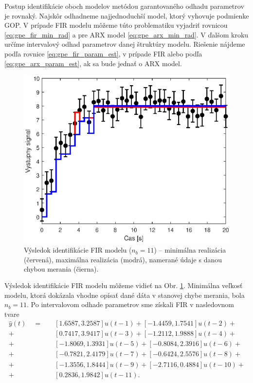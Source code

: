 Postup identifikácie oboch modelov metódou garantovaného odhadu parametrov je rovnaký. Najskôr odhadneme najjednoduchší model, ktorý vyhovuje podmienke GOP. V prípade FIR modelu môžeme túto problematiku vyjadriť rovnicou \ref{eq:gpe_fir_min_rad} a pre ARX model \ref{eq:gpe_arx_min_rad}. V ďalšom kroku určíme intervalový odhad parametrov danej štruktúry modelu. Riešenie nájdeme podľa rovnice \ref{eq:gpe_fir_param_est}, v prípade FIR alebo podľa \ref{eq:gpe_arx_param_est}, ak sa bude jednať o ARX model.

\begin{figure}
	\centering
	\includegraphics[width=0.7\linewidth]{images/gpe_tf_ex_FIRident}
	\caption{Výsledok identifikácie FIR modelu ($ n_b = 11 $) -- minimálna realizácia (červená), maximálna realizácia (modrá), namerané údaje s danou chybou merania (čierna).}
	\label{fig:gpe_tf_ex_FIR}
\end{figure}

Výsledok identifikácie FIR modelu môžeme vidieť na Obr. \ref{fig:gpe_tf_ex_FIR}. Minimálna veľkosť modelu, ktorá dokázala vhodne opísať dané dáta v stanovej chybe merania, bola $ n_b = 11 $. Po intervalovom odhade parametrov sme získali FIR v nasledovnom tvare
\begin{equation*}
	\begin{split}
		\hat{y}(t) \quad = \quad &[1.6587, 3.2587]u(t-1) + [-1.4459, 1.7541]u(t-2) + \\
		 + &[0.7417, 3.9417]u(t-3) + [-1.2112, 1.9888]u(t-4) + \\
		 + &[-1.8069, 1.3931]u(t-5) + [-0.8084, 2.3916]u(t-6) + \\
		 + &[-0.7821, 2.4179]u(t-7) + [-0.6424, 2.5576]u(t-8) + \\
		 + &[-1.3556, 1.8444]u(t-9) + [-2.7116, 0.4884]u(t-10) + \\
		 + &[0.2836, 1.9842]u(t-11).
	\end{split}
\end{equation*}

